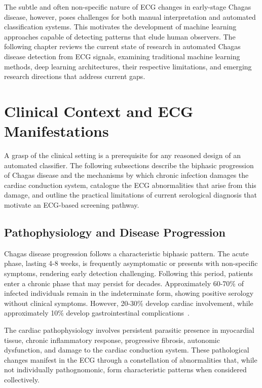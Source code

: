 The subtle and often non-specific nature of ECG changes in early-stage Chagas disease, however, poses challenges for both manual interpretation and automated classification systems. This motivates the development of machine learning approaches capable of detecting patterns that elude human observers. The following chapter reviews the current state of research in automated Chagas disease detection from ECG signals, examining traditional machine learning methods, deep learning architectures, their respective limitations, and emerging research directions that address current gaps.

\section{Clinical Context and ECG Manifestations}

A grasp of the clinical setting is a prerequisite for any reasoned design of an automated classifier. The following subsections describe the biphasic progression of Chagas disease and the mechanisms by which chronic infection damages the cardiac conduction system, catalogue the ECG abnormalities that arise from this damage, and outline the practical limitations of current serological diagnosis that motivate an ECG-based screening pathway.

\subsection{Pathophysiology and Disease Progression}

Chagas disease progression follows a characteristic biphasic pattern. The acute phase, lasting 4-8 weeks, is frequently asymptomatic or presents with non-specific symptoms, rendering early detection challenging. Following this period, patients enter a chronic phase that may persist for decades. Approximately 60-70\% of infected individuals remain in the indeterminate form, showing positive serology without clinical symptoms. However, 20-30\% develop cardiac involvement, while approximately 10\% develop gastrointestinal complications~\cite{nunes2018chagas}.

The cardiac pathophysiology involves persistent parasitic presence in myocardial tissue, chronic inflammatory response, progressive fibrosis, autonomic dysfunction, and damage to the cardiac conduction system. These pathological changes manifest in the ECG through a constellation of abnormalities that, while not individually pathognomonic, form characteristic patterns when considered collectively.


